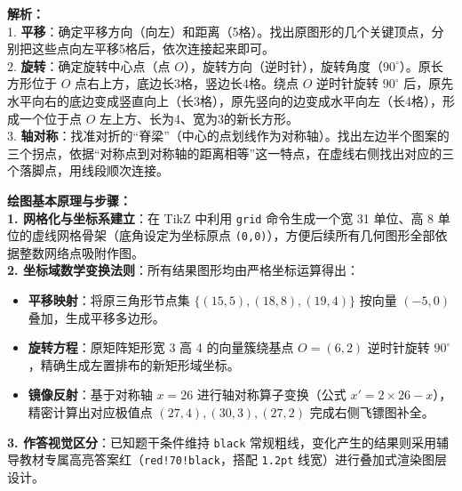 \vspace{0.8cm}

{\small\color{gray}
\textbf{解析：}\\
1. \textbf{平移}：确定平移方向（向左）和距离（5格）。找出原图形的几个关键顶点，分别把这些点向左平移5格后，依次连接起来即可。\\
2. \textbf{旋转}：确定旋转中心点（点 $O$），旋转方向（逆时针），旋转角度（$90^{\circ}$）。原长方形位于 $O$ 点右上方，底边长3格，竖边长4格。绕点 $O$ 逆时针旋转 $90^{\circ}$ 后，原先水平向右的底边变成竖直向上（长3格），原先竖向的边变成水平向左（长4格），形成一个位于点 $O$ 左上方、长为4、宽为3的新长方形。\\
3. \textbf{轴对称}：找准对折的“脊梁”（中心的点划线作为对称轴）。找出左边半个图案的三个拐点，依据“对称点到对称轴的距离相等”这一特点，在虚线右侧找出对应的三个落脚点，用线段顺次连接。
}

\vspace{0.6cm}

{\small\color{blue!70!black}
\textbf{绘图基本原理与步骤：}\\
\textbf{1. 网格化与坐标系建立}：在 TikZ 中利用 \texttt{grid} 命令生成一个宽 31 单位、高 8 单位的虚线网格骨架（底角设定为坐标原点 \texttt{(0,0)}），方便后续所有几何图形全部依据整数网络点吸附作图。\\
\textbf{2. 坐标域数学变换法则}：所有结果图形均由严格坐标运算得出：
   \begin{itemize}
       \item \textbf{平移映射}：将原三角形节点集 $\{(15,5), (18,8), (19,4)\}$ 按向量 $(-5, 0)$ 叠加，生成平移多边形。
       \item \textbf{旋转方程}：原矩阵矩形宽 3 高 4 的向量簇绕基点 $O=(6,2)$ 逆时针旋转 $90^{\circ}$，精确生成左置排布的新矩形域坐标。
       \item \textbf{镜像反射}：基于对称轴 $x=26$ 进行轴对称算子变换（公式 $x' = 2 \times 26 - x$），精密计算出对应极值点 $(27,4), (30,3), (27,2)$ 完成右侧飞镖图补全。
   \end{itemize}
\textbf{3. 作答视觉区分}：已知题干条件维持 \texttt{black} 常规粗线，变化产生的结果则采用辅导教材专属高亮答案红（\texttt{red!70!black}，搭配 \texttt{1.2pt} 线宽）进行叠加式渲染图层设计。
}


\newpage
